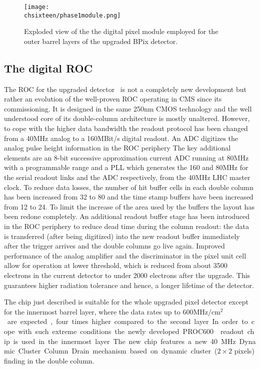 \begin{figure}[!htb]
 \begin{center}
 \texttt{[image: \\chsixteen/phase1module.png]}
 \end{center}
 \caption{Exploded view of the the digital pixel module employed for the outer barrel layers of the upgraded BPix detector.}
 \label{fig:Phase1Mod}
\end{figure}

\subsection*{The digital ROC}

The ROC for the upgraded detector~\cite{Kastli201388} is not a completely new development but rather an evolution of the well-proven ROC operating in CMS since its commissioning.
It is designed in the same 250\unit{nm} CMOS technology and the well understood core of its double-column architecture is mostly unaltered.
However, to cope with the higher data bandwidth the readout protocol has been changed from a 40\unit{MHz} analog to a 160\unit{MBit/s} digital readout. An ADC digitizes the analog pulse height information in the ROC periphery
The key additional elements are an 8-bit successive approximation current ADC running at 80\unit{MHz} with a programmable range and a PLL which generates the 160 and 80\unit{MHz} for the serial readout links and the ADC respectively, from the 40\unit{MHz} LHC master clock.
To reduce data losses, the number of hit buffer cells in each double column has been increased from 32 to 80 and the time stamp buffers have been increased from 12 to 24.
To limit the increase of the area used by the buffers the layout has been redone completely.
An additional readout buffer stage has been introduced in the ROC periphery to reduce dead time during the column readout: the data is transferred (after being digitized) into the new readout buffer immediately after the trigger arrives and the double columns go live again.
Improved performance of the analog amplifier and the discriminator in the pixel unit cell allow for operation at lower threshold, which is reduced from about 3500 electrons in the current detector to under 2000 electrons after the upgrade. This guarantees higher radiation tolerance and hence, a longer lifetime of the detector.

The chip just described is suitable for the whole upgraded pixel detector except for the innermost barrel layer, where the data rates up to 600\unit{MHz/cm$^2$} are expected, four times higher compared to the second layer.
In order to cope with such extreme conditions the newly developed PROC600~\cite{Starodumov:2227967} readout chip is used in the innermost layer. The new chip features a new 40\unit{MHz} Dynamic Cluster Column Drain mechanism based on dynamic cluster ($2\times2$ pixels) finding in the double column.

